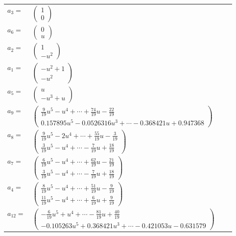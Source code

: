 \documentclass[1p]{elsarticle_modified}
\theoremstyle{definition}
\begin{document}
\begin{tabular}{m{7pt} m{180pt} m{7pt} m{180pt} }
\flushright $a_{3}=$&$\begin{pmatrix}1\\0\end{pmatrix}$ \\
\flushright $a_{6}=$&$\begin{pmatrix}0\\u\end{pmatrix}$ \\
\flushright $a_{2}=$&$\begin{pmatrix}1\\- u^2\end{pmatrix}$ \\
\flushright $a_{1}=$&$\begin{pmatrix}- u^2+1\\- u^2\end{pmatrix}$ \\
\flushright $a_{5}=$&$\begin{pmatrix}u\\- u^3+u\end{pmatrix}$ \\
\flushright $a_{9}=$&$\begin{pmatrix}\frac{9}{19} u^5- u^4+\cdots+\frac{74}{19} u-\frac{22}{19}\\0.157895 u^{5}-0.0526316 u^{3}+\cdots-0.368421 u+0.947368\end{pmatrix}$ \\
\flushright $a_{8}=$&$\begin{pmatrix}\frac{9}{19} u^5-2 u^4+\cdots+\frac{55}{19} u-\frac{3}{19}\\\frac{3}{19} u^5- u^4+\cdots-\frac{7}{19} u+\frac{18}{19}\end{pmatrix}$ \\
\flushright $a_{7}=$&$\begin{pmatrix}\frac{6}{19} u^5- u^4+\cdots+\frac{62}{19} u-\frac{21}{19}\\\frac{3}{19} u^5- u^4+\cdots-\frac{7}{19} u+\frac{18}{19}\end{pmatrix}$ \\
\flushright $a_{4}=$&$\begin{pmatrix}\frac{8}{19} u^5- u^4+\cdots+\frac{51}{19} u-\frac{9}{19}\\\frac{11}{19} u^5- u^4+\cdots+\frac{6}{19} u+\frac{9}{19}\end{pmatrix}$ \\
\flushright $a_{12}=$&$\begin{pmatrix}-\frac{6}{19} u^5+u^4+\cdots-\frac{81}{19} u+\frac{40}{19}\\-0.105263 u^{5}+0.368421 u^{3}+\cdots-0.421053 u-0.631579\end{pmatrix}$ \\

\end{tabular}
\end{document}

